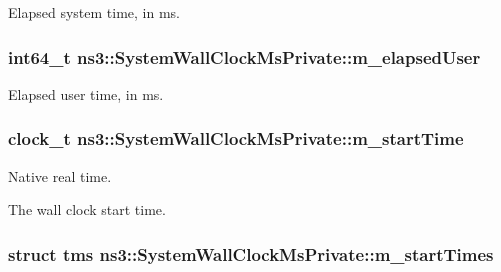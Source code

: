 Elapsed system time, in ms. 

\subsubsection[{\texorpdfstring{m\+\_\+elapsed\+User}{m_elapsedUser}}]{\setlength{\rightskip}{0pt plus 5cm}int64\+\_\+t ns3\+::\+System\+Wall\+Clock\+Ms\+Private\+::m\+\_\+elapsed\+User\hspace{0.3cm}{\ttfamily [private]}}\hypertarget{classns3_1_1SystemWallClockMsPrivate_a9e58a44e59f4c3ef32e0c43d7c1f7f96}{}\label{classns3_1_1SystemWallClockMsPrivate_a9e58a44e59f4c3ef32e0c43d7c1f7f96}


Elapsed user time, in ms. 

\subsubsection[{\texorpdfstring{m\+\_\+start\+Time}{m_startTime}}]{\setlength{\rightskip}{0pt plus 5cm}clock\+\_\+t ns3\+::\+System\+Wall\+Clock\+Ms\+Private\+::m\+\_\+start\+Time\hspace{0.3cm}{\ttfamily [private]}}\hypertarget{classns3_1_1SystemWallClockMsPrivate_afccba62a8e771adfc7455bd8a5c15530}{}\label{classns3_1_1SystemWallClockMsPrivate_afccba62a8e771adfc7455bd8a5c15530}


Native real time. 

The wall clock start time. 
\subsubsection[{\texorpdfstring{m\+\_\+start\+Times}{m_startTimes}}]{\setlength{\rightskip}{0pt plus 5cm}struct tms ns3\+::\+System\+Wall\+Clock\+Ms\+Private\+::m\+\_\+start\+Times\hspace{0.3cm}{\ttfamily [private]}}\hypertarget{classns3_1_1SystemWallClockMsPrivate_afd7e8cf04dc6d964b8b6b304de51124f}{}\label{classns3_1_1SystemWallClockMsPrivate_afd7e8cf04dc6d964b8b6b304de51124f}


